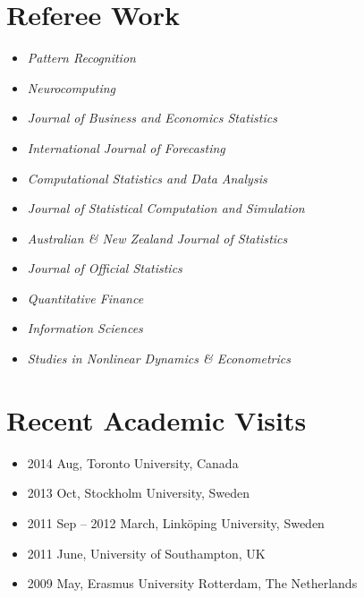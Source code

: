 \documentclass[twoside,a4paper,10.5pt]{article}
\begin{document}
\section*{Referee Work}
\begin{itemize}
\item \emph{Pattern Recognition}
\item \emph{Neurocomputing}
\item \emph{Journal of Business and Economics Statistics}
\item \emph{International Journal of Forecasting}
\item \emph{Computational Statistics and Data Analysis}
\item \emph{Journal of Statistical Computation and Simulation}
\item \emph{Australian \& New Zealand Journal of Statistics}
\item \emph{Journal of Official Statistics}
\item \emph{Quantitative Finance}
\item \emph{Information Sciences}
\item \emph{Studies in Nonlinear Dynamics \& Econometrics}

\end{itemize}


\section*{Recent Academic Visits}

\begin{itemize}
\item 2014 Aug, Toronto University, Canada
\item 2013 Oct, Stockholm University, Sweden
\item 2011 Sep – 2012 March, Linköping University, Sweden
\item 2011 June, University of Southampton, UK
\item 2009 May, Erasmus University Rotterdam, The Netherlands
\end{itemize}





\end{document}
